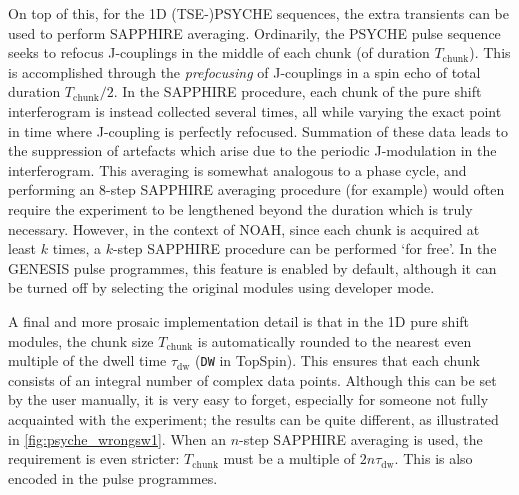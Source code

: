 On top of this, for the 1D (TSE-)PSYCHE sequences, the extra transients can be used to perform SAPPHIRE averaging\autocite{Moutzouri2017CC}.
Ordinarily, the PSYCHE pulse sequence seeks to refocus J-couplings in the middle of each chunk (of duration $T_\text{chunk}$).
This is accomplished through the \textit{prefocusing} of J-couplings in a spin echo of total duration $T_\text{chunk}/2$.\autocite{Aguilar2010ACIE}
In the SAPPHIRE procedure, each chunk of the pure shift interferogram is instead collected several times, all while varying the exact point in time where J-coupling is perfectly refocused.
Summation of these data leads to the suppression of artefacts which arise due to the periodic J-modulation in the interferogram.
This averaging is somewhat analogous to a phase cycle, and performing an 8-step SAPPHIRE averaging procedure (for example) would often require the experiment to be lengthened beyond the duration which is truly necessary.
However, in the context of NOAH, since each chunk is acquired at least $k$ times, a $k$-step SAPPHIRE procedure can be performed `for free'.
In the GENESIS pulse programmes, this feature is enabled by default, although it can be turned off by selecting the original modules using developer mode.

A final and more prosaic implementation detail is that in the 1D pure shift modules, the chunk size $T_\text{chunk}$ is automatically rounded to the nearest even multiple of the dwell time $\tau_\text{dw}$ (\texttt{DW} in TopSpin).
This ensures that each chunk consists of an integral number of complex data points.
Although this can be set by the user manually, it is very easy to forget, especially for someone not fully acquainted with the experiment; the results can be quite different, as illustrated in \cref{fig:psyche_wrongsw1}.
When an $n$-step SAPPHIRE averaging is used, the requirement is even stricter: $T_\text{chunk}$ must be a multiple of $2n \tau_\text{dw}$.
This is also encoded in the pulse programmes.
